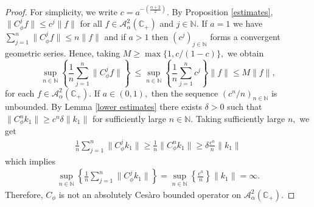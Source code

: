 \documentclass[11pt]{amsart}%
\numberwithin{equation}{section}
\theoremstyle{plain}
\theoremstyle{definition}
\theoremstyle{definition}
\newcommand{\hb}{\mathbb{C}_+}
\newcommand{\Ber}{\mathcal{A}^2_{\alpha}(\hb)}
\begin{document}
\begin{proof} For simplicity, we write $c= a^{-\left(\frac{\alpha+2}{2}\right)}$. By Proposition \ref{estimates}, $\|C^{j}_{\phi}f\|\le c^{j}\|f\|$ for all $f\in \Ber$ and $j\in \mathbb{N}.$ If $a=1$ we have $\displaystyle \sum_{j=1}^n\|C_{\phi}^jf\|\leq n\|f\|$  and if $a>1$ then $(c^j)_{j\in \mathbb{N}}$ forms a convergent geometric series. Hence, taking $M\geq \max\{1, c/(1-c)\},$ we obtain
\begin{equation*}
\sup_{n \in \mathbb N}\left\lbrace  \dfrac{1}{n}\sum_{j=1}^{n}\|C^j_{\phi}f\|\right\rbrace\ \leq \sup_{n \in \mathbb{N}}\left\lbrace \dfrac{1}{n}\sum_{j=1}^{n}c^{j}\right\rbrace\|f\| \leq M\|f\|,
\end{equation*}
for each $f\in \Ber.$ If $a \in (0,1),$ then the sequence $(c^{n}/n)_{n\in \mathbb{N}}$ is unbounded. By Lemma \ref{lower estimates} there exists $\delta > 0$ such that $\|C^{n}_{\phi}k_1\| \geq c^{n}\delta\|k_1\|$ for sufficiently large $n \in \mathbb{N}.$ Taking sufficiently large $n,$ we get
\begin{align*}
\frac{1}{n}\sum_{j=1}^{n}\|C^{j}_{\phi}k_1\|\geq \frac{1}{n}\|C_{\phi}^nk_1\|\geq \delta \frac{c^n}{n}\|k_1\|
\end{align*}
which implies 
 \begin{align*}
\sup_{n\in \mathbb{N}}\left\lbrace \frac{1}{n}\sum_{j=1}^{n}\|C^{j}_{\phi}k_1\|\right\rbrace=\sup_{n\in\mathbb{N}}\left\lbrace\frac{c^{n}}{n}\right\rbrace\|k_1\|=\infty.
\end{align*}
Therefore, $C_{\phi}$ is not an absolutely Cesàro bounded operator on $\Ber.$
 \end{proof}
 
\end{document}
